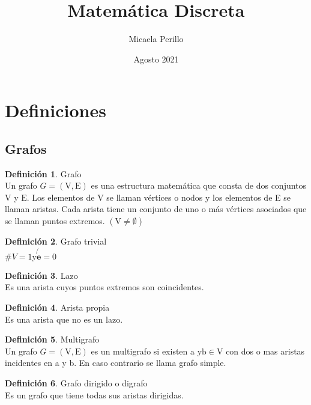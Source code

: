 \documentclass{article}
\title{Matemática Discreta}
\author{Micaela Perillo}
\date{Agosto 2021}
\begin{document}
\maketitle
\thispagestyle{empty}
\pagebreak
\tableofcontents
\thispagestyle{empty}
\pagebreak
{} 

\section{Definiciones}
\theoremstyle{definition}
\newtheorem{defn}{Definición}

\subsection{Grafos}
\begin{defn}
Grafo \\ Un grafo $G=(\mathrm{V}, \mathrm{E})$ es una estructura matemática que consta de dos conjuntos $\mathrm{V}$ y $\mathrm{E}$. Los elementos de V se llaman vértices o nodos y los elementos de E se llaman aristas. Cada
arista tiene un conjunto de uno o más vértices asociados que se llaman puntos extremos. $(\mathrm{V} \neq \emptyset)$
\end{defn}

\begin{defn}
Grafo trivial \\ $\#V=1 \mathrm{y} \mathbf{\not{e}}=0$
\end{defn}

\begin{defn}
Lazo \\ Es una arista cuyos puntos extremos son coincidentes.
\end{defn}

\begin{defn}
Arista propia \\ Es una arista que no es un lazo.
\end{defn}

\begin{defn}
Multigrafo \\ Un grafo $G=(\mathrm{V}, \mathrm{E})$ es un multigrafo si existen a $\mathrm{y} \mathrm{b} \in \mathrm{V}$ con dos o mas aristas incidentes en a y b. En caso contrario se llama grafo simple.
\end{defn}

\begin{defn}
Grafo dirigido o digrafo \\ Es un grafo que tiene todas sus aristas dirigidas.
\end{defn}
\end{document}
